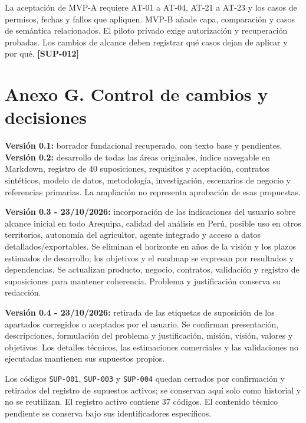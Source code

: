 \documentclass[10pt,a4paper]{article}
\begin{document}
La aceptación de MVP-A requiere AT-01 a AT-04, AT-21 a AT-23 y los casos de permisos, fechas y fallos que apliquen. MVP-B añade capa, comparación y casos de semántica relacionados. El piloto privado exige autorización y recuperación probadas. Los cambios de alcance deben registrar qué casos dejan de aplicar y por qué. \textbf{[SUP-012]}


\clearpage\section{Anexo G. Control de cambios y decisiones}\label{anexo-g-control-de-cambios-y-decisiones}

\textbf{Versión 0.1:} borrador fundacional recuperado, con texto base y pendientes. \textbf{Versión 0.2:} desarrollo de todas las áreas originales, índice navegable en Markdown, registro de 40 suposiciones, requisitos y aceptación, contratos sintéticos, modelo de datos, metodología, investigación, escenarios de negocio y referencias primarias. La ampliación no representa aprobación de esas propuestas.


\textbf{Versión 0.3 - 23/\allowbreak{}10/\allowbreak{}2026:} incorporación de las indicaciones del usuario sobre alcance inicial en todo Arequipa, calidad del análisis en Perú, posible uso en otros territorios, autonomía del agricultor, agente integrado y acceso a datos detallados/\allowbreak{}exportables. Se eliminan el horizonte en años de la visión y los plazos estimados de desarrollo; los objetivos y el roadmap se expresan por resultados y dependencias. Se actualizan producto, negocio, contratos, validación y registro de suposiciones para mantener coherencia. Problema y justificación conserva su redacción.


\textbf{Versión 0.4 - 23/\allowbreak{}10/\allowbreak{}2026:} retirada de las etiquetas de suposición de los apartados corregidos o aceptados por el usuario. Se confirman presentación, descripciones, formulación del problema y justificación, misión, visión, valores y objetivos. Los detalles técnicos, las estimaciones comerciales y las validaciones no ejecutadas mantienen sus supuestos propios.


Los códigos \texttt{SUP-001}, \texttt{SUP-003} y \texttt{SUP-004} quedan cerrados por confirmación y retirados del registro de supuestos activos; se conservan aquí solo como historial y no se reutilizan. El registro activo contiene 37 códigos. El contenido técnico pendiente se conserva bajo sus identificadores específicos.
\end{document}
